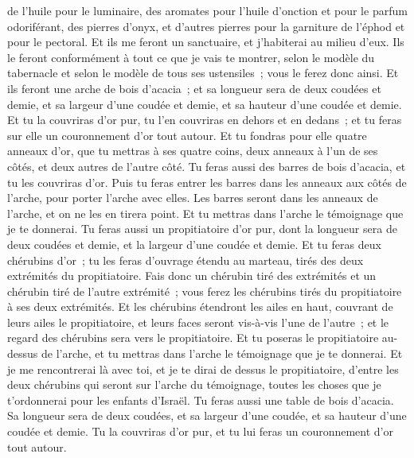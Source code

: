 \begin{multicols}{2}
de l'huile pour le luminaire, des aromates pour l'huile d'onction et pour le parfum odoriférant,
des pierres d'onyx, et d'autres pierres pour la garniture de l'éphod et pour le pectoral.
Et ils me feront un sanctuaire, et j'habiterai au milieu d'eux.
Ils le feront conformément à tout ce que je vais te montrer, selon le modèle du tabernacle et selon le modèle de tous ses ustensiles~; vous le ferez donc ainsi.
Et ils feront une arche de bois d'acacia~; et sa longueur sera de deux coudées et demie, et sa largeur d'une coudée et demie, et sa hauteur d'une coudée et demie.
Et tu la couvriras d'or pur, tu l'en couvriras en dehors et en dedans~; et tu feras sur elle un couronnement d'or tout autour.
Et tu fondras pour elle quatre anneaux d'or, que tu mettras à ses quatre coins, deux anneaux à l'un de ses côtés, et deux autres de l'autre côté.
Tu feras aussi des barres de bois d'acacia, et tu les couvriras d'or.
Puis tu feras entrer les barres dans les anneaux aux côtés de l'arche, pour porter l'arche avec elles.
Les barres seront dans les anneaux de l'arche, et on ne les en tirera point.
Et tu mettras dans l'arche le témoignage que je te donnerai.
Tu feras aussi un propitiatoire d'or pur, dont la longueur sera de deux coudées et demie, et la largeur d'une coudée et demie.
Et tu feras deux chérubins d'or~; tu les feras d'ouvrage étendu au marteau, tirés des deux extrémités du propitiatoire.
Fais donc un chérubin tiré des extrémités et un chérubin tiré de l'autre extrémité~; vous ferez les chérubins tirés du propitiatoire à ses deux extrémités.
Et les chérubins étendront les ailes en haut, couvrant de leurs ailes le propitiatoire, et leurs faces seront vis-à-vis l'une de l'autre~; et le regard des chérubins sera vers le propitiatoire.
Et tu poseras le propitiatoire au-dessus de l'arche, et tu mettras dans l'arche le témoignage que je te donnerai.
Et je me rencontrerai là avec toi, et je te dirai de dessus le propitiatoire, d'entre les deux chérubins qui seront sur l'arche du témoignage, toutes les choses que je t'ordonnerai pour les enfants d'Israël.
Tu feras aussi une table de bois d'acacia. Sa longueur sera de deux coudées, et sa largeur d'une coudée, et sa hauteur d'une coudée et demie.
Tu la couvriras d'or pur, et tu lui feras un couronnement d'or tout autour.

\end{multicols}
